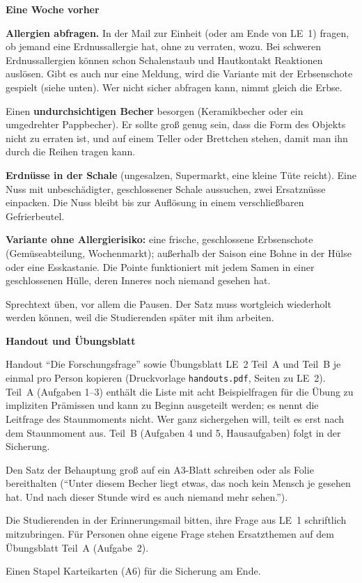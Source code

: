 \begin{vorbereitung}
\textbf{Eine Woche vorher}
\begin{checkliste}
  \item \textbf{Allergien abfragen.} In der Mail zur Einheit (oder am Ende
    von LE~1) fragen, ob jemand eine Erdnussallergie hat, ohne zu
    verraten, wozu. Bei schweren Erdnussallergien können schon Schalenstaub
    und Hautkontakt Reaktionen auslösen. Gibt es auch nur eine Meldung,
    wird die Variante mit der Erbsenschote gespielt (siehe unten). Wer
    nicht sicher abfragen kann, nimmt gleich die Erbse.
  \item Einen \textbf{undurchsichtigen Becher} besorgen (Keramikbecher oder
    ein umgedrehter Pappbecher). Er sollte groß genug sein, dass die Form
    des Objekts nicht zu erraten ist, und auf einem Teller oder Brettchen
    stehen, damit man ihn durch die Reihen tragen kann.
  \item \textbf{Erdnüsse in der Schale} (ungesalzen, Supermarkt, eine kleine
    Tüte reicht). Eine Nuss mit unbeschädigter, geschlossener Schale
    aussuchen, zwei Ersatznüsse einpacken. Die Nuss bleibt bis zur
    Auflösung in einem verschließbaren Gefrierbeutel.
  \item \textbf{Variante ohne Allergierisiko:} eine frische, geschlossene
    Erbsenschote (Gemüseabteilung, Wochenmarkt); außerhalb der Saison eine
    Bohne in der Hülse oder eine Esskastanie. Die Pointe funktioniert mit
    jedem Samen in einer geschlossenen Hülle, deren Inneres noch niemand
    gesehen hat.
  \item Sprechtext üben, vor allem die Pausen. Der Satz muss wortgleich
    wiederholt werden können, weil die Studierenden später mit ihm
    arbeiten.
\end{checkliste}

\textbf{Handout und Übungsblatt}
\begin{checkliste}
  \item Handout \enquote{Die Forschungsfrage} sowie Übungsblatt LE~2
    Teil~A und Teil~B je einmal pro Person kopieren (Druckvorlage
    \texttt{handouts.pdf}, Seiten zu LE~2). Teil~A (Aufgaben 1--3) enthält
    die Liste mit acht Beispielfragen für die Übung zu impliziten Prämissen
    und kann zu Beginn ausgeteilt werden; es nennt die Leitfrage des
    Staunmoments nicht. Wer ganz sichergehen will, teilt es erst nach dem
    Staunmoment aus. Teil~B (Aufgaben 4 und 5, Hausaufgaben) folgt in der
    Sicherung.
  \item Den Satz der Behauptung groß auf ein A3-Blatt schreiben oder als
    Folie bereithalten (\enquote{Unter diesem Becher liegt etwas, das noch
    kein Mensch je gesehen hat. Und nach dieser Stunde wird es auch niemand
    mehr sehen.}).
  \item Die Studierenden in der Erinnerungsmail bitten, ihre Frage aus LE~1
    schriftlich mitzubringen. Für Personen ohne eigene Frage stehen
    Ersatzthemen auf dem Übungsblatt Teil~A (Aufgabe~2).
  \item Einen Stapel Karteikarten (A6) für die Sicherung am Ende.
\end{checkliste}


\end{vorbereitung}
